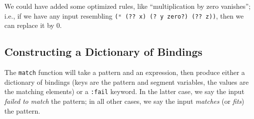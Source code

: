 \begin{remark}
We could have added some optimized rules, like ``multiplication by zero
vanishes''; i.e., if we have any input
resembling \lstinline[language=lisp]{(* (?? x) (? y zero?) (?? z))},
then we can replace it by $0$.
\end{remark}

\subsection{Constructing a Dictionary of Bindings}

The \lstinline[language=lisp]{match} function will take a pattern and an
expression, then produce either a dictionary of bindings (keys are the
pattern and segment variables, the values are the matching elements) or
a \lstinline[language=lisp]{:fail} keyword. In the latter case, we say
the input \emph{failed to match} the pattern; in all other cases, we say
the input \emph{matches} (or \emph{fits}) the pattern.

